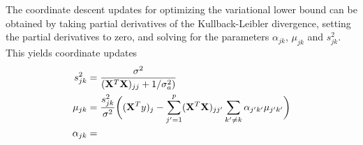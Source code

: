 \documentclass[final]{siamltex}
\begin{document}
The coordinate descent updates for optimizing the variational lower
bound can be obtained by taking partial derivatives of the
Kullback-Leibler divergence, setting the partial derivatives to zero,
and solving for the parameters $\alpha_{jk}$, $\mu_{jk}$ and
$s_{jk}^2$. This yields coordinate updates
\begin{align*}
s_{jk}^2 &= \frac{\sigma^2}{({\bf X}^T{\bf X})_{jj} + 1/\sigma_a^2)} \\
\mu_{jk} &= \frac{s_{jk}^2}{\sigma^2}
\bigg(({\bf X}^Ty)_j 
- \sum_{j'=1}^p ({\bf X}^T{\bf X})_{jj'} 
  \sum_{k' \neq k} \alpha_{j'k'} \mu_{j'k'} \bigg) \\
\alpha_{jk} &=
\end{align*}
\end{document}
